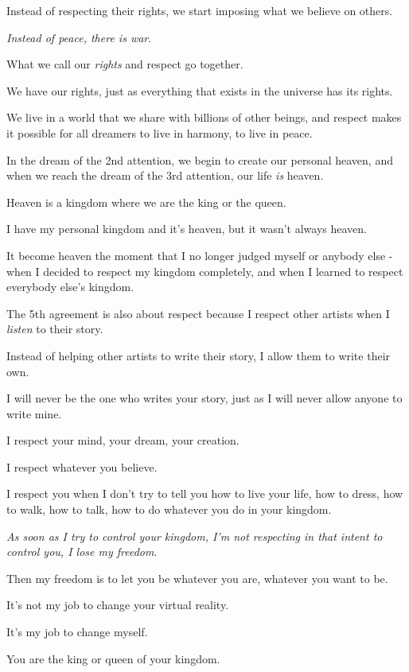 \documentclass{article}
\numberwithin{equation}{section}
\begin{document}
Instead of respecting their rights, we start imposing what we believe on others.

\textit{Instead of peace, there is war}.

%

What we call our \textit{rights} and respect go together.

We have our rights, just as everything that exists in the universe has its rights.

We live in a world that we share with billions of other beings, and respect makes it possible for all dreamers to live in harmony, to live in peace.

%
In the dream of the 2nd attention, we begin to create our personal heaven, and when we reach the dream of the 3rd attention, our life \textit{is} heaven.

Heaven is a kingdom where we are the king or the queen.

I have my personal kingdom and it's heaven, but it wasn't always heaven.

It become heaven the moment that I no longer judged myself or anybody else - when I decided to respect my kingdom completely, and when I learned to respect everybody else's kingdom.

The 5th agreement is also about respect because I respect other artists when I \textit{listen} to their story.

Instead of helping other artists to write their story, I allow them to write their own.

%
I will never be the one who writes your story, just as I will never allow anyone to write mine.

I respect your mind, your dream, your creation.

I respect whatever you believe.

I respect you when I don't try to tell you how to live your life, how to dress, how to walk, how to talk, how to do whatever you do in your kingdom.

\textit{As soon as I try to control your kingdom, I'm not respecting in that intent to control you, I lose my freedom}.

Then my freedom is to let you be whatever you are, whatever you want to be.

It's not my job to change your virtual reality.

It's my job to change myself.

%
You are the king or queen of your kingdom.
\end{document}

